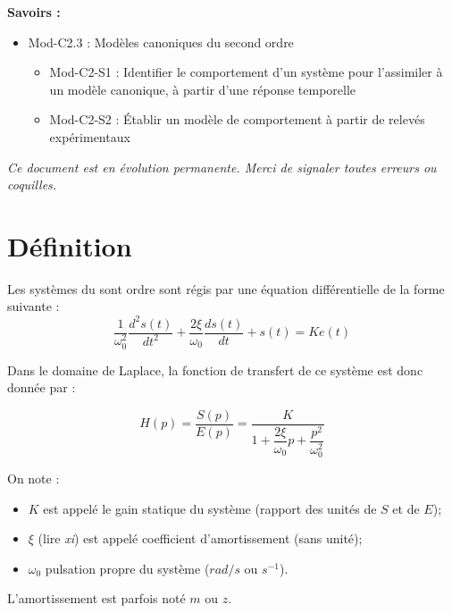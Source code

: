 \documentclass[11pt,oneside]{article}
\begin{document}
\begin{savoir}
\textbf{Savoirs :}
\begin{itemize}
\item Mod-C2.3 : Modèles canoniques du second ordre
\begin{itemize}
\item Mod-C2-S1 : Identifier le comportement d’un système pour l’assimiler à un modèle canonique, à partir d’une réponse temporelle 
\item Mod-C2-S2 : Établir un modèle de comportement à partir de relevés expérimentaux
\end{itemize}
\end{itemize}
\end{savoir}

\setlength{\parskip}{0ex plus 0.2ex minus 0ex}
 \renewcommand{\contentsname}{}
 \renewcommand{\baselinestretch}{1}

\textit{Ce document est en évolution permanente. Merci de signaler toutes
erreurs ou coquilles.}

\tableofcontents

 \renewcommand{\baselinestretch}{1.2}
\setlength{\parskip}{2ex plus 0.5ex minus 0.2ex}



\section{Définition}


Les systèmes du sont ordre sont régis par une équation différentielle de la
forme suivante :
$$
\dfrac{1}{\omega_0^2} \dfrac{d^2 s(t)}{dt^2}+\dfrac{2\xi}{\omega_0} \dfrac{d s(t)}{dt}+s(t) = Ke(t)
$$



\begin{defi}
Dans le domaine de Laplace, la fonction de transfert de ce système est donc
donnée par :

$$
H(p) 
= \dfrac{S(p)}{E(p)} 
= \dfrac{K}{1+ \dfrac{2\xi}{\omega_0}p+\dfrac{p^2}{\omega_0^2}}
$$

On note :
\begin{itemize}
\item $K$ est appelé le gain statique du système (rapport des unités de $S$ et de $E$);
\item $\xi$ (lire \textit{xi}) est appelé coefficient d'amortissement (sans unité);
\item $\omega_0$ pulsation propre du système ($rad/s$ ou $s^{-1}$).
\end{itemize}

\end{defi}
L'amortissement est parfois noté $m$ ou $z$.
\end{document}
